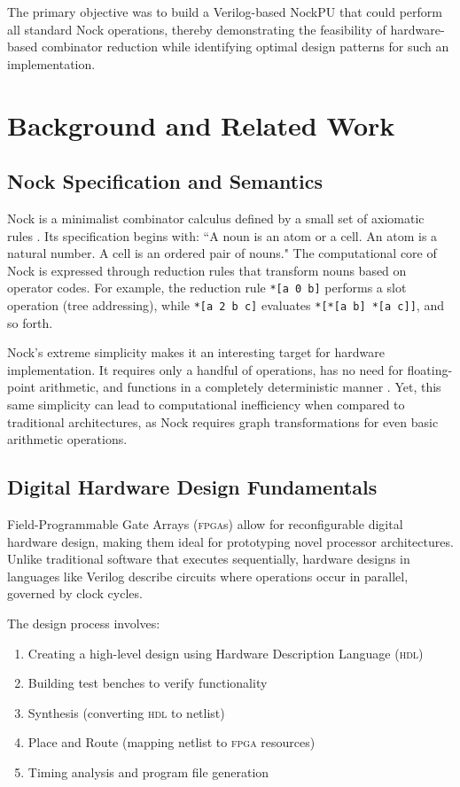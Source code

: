 \documentclass[twoside]{article}
\begin{document}
\noindent
The primary objective was to build a Verilog-based NockPU that could perform all standard Nock operations, thereby demonstrating the feasibility of hardware-based combinator reduction while identifying optimal design patterns for such an implementation.

\section{Background and Related Work}

\subsection{Nock Specification and Semantics}

Nock is a minimalist combinator calculus defined by a small set of axiomatic rules \citep{Nock4K}. Its specification begins with: ``A noun is an atom or a cell. An atom is a natural number. A cell is an ordered pair of nouns." The computational core of Nock is expressed through reduction rules that transform nouns based on operator codes. For example, the reduction rule \texttt{*[a 0 b]} performs a slot operation (tree addressing), while \texttt{*[a 2 b c]} evaluates \texttt{*[*[a b] *[a c]]}, and so forth.

Nock's extreme simplicity makes it an interesting target for hardware implementation. It requires only a handful of operations, has no need for floating-point arithmetic, and functions in a completely deterministic manner \citep{Whitepaper}. Yet, this same simplicity can lead to computational inefficiency when compared to traditional architectures, as Nock requires graph transformations for even basic arithmetic operations.

\subsection{Digital Hardware Design Fundamentals}

Field-Programmable Gate Arrays (\textsc{fpga}s) allow for reconfigurable digital hardware design, making them ideal for prototyping novel processor architectures. Unlike traditional software that executes sequentially, hardware designs in languages like Verilog describe circuits where operations occur in parallel, governed by clock cycles.

The design process involves:
\begin{enumerate}
  \item Creating a high-level design using Hardware Description Language (\textsc{hdl})
  \item Building test benches to verify functionality
  \item Synthesis (converting \textsc{hdl} to netlist)
  \item Place and Route (mapping netlist to \textsc{fpga} resources)
  \item Timing analysis and program file generation
\end{enumerate}
\end{document}
